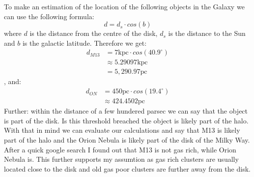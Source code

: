 To make an estimation of the location of the following objects in the Galaxy we can use the following
formula:
\begin{equation*}
 d = d_s \cdot cos(b)
\end{equation*}
where $d$ is the distance from the centre of the disk, $d_s$ is the distance to the Sun and $b$ is the
galactic latitude. Therefore we get:
\begin{equation*}
  \begin{split}
    d_{M13} &= 7 \text{kpc} \cdot cos(40.9^{\circ})\\
            &\approx 5.29097 \text{kpc}\\
            &= 5,290.97 \text{pc}
  \end{split}
\end{equation*}
, and:
\begin{equation*}
  \begin{split}
    d_{ON} &= 450 \text{pc} \cdot cos(19.4^{\circ})\\
           &\approx 424.4502 \text{pc}
  \end{split}
\end{equation*}
Further: within the distance of a few hundered parsec we can say that the object is part of the disk. Is
this threshold breached the object is likely part of the halo.\\
With that in mind we can evaluate our calculations and say that M13 is likely part of the halo and the 
Orion Nebula is likely part of the disk of the Milky Way. After a quick google search I found out that
M13 is not gas rich, while Orion Nebula is. This further supports my assumtion as gas rich clusters are
usually located close to the disk and old gas poor clusters are further away from the disk.

